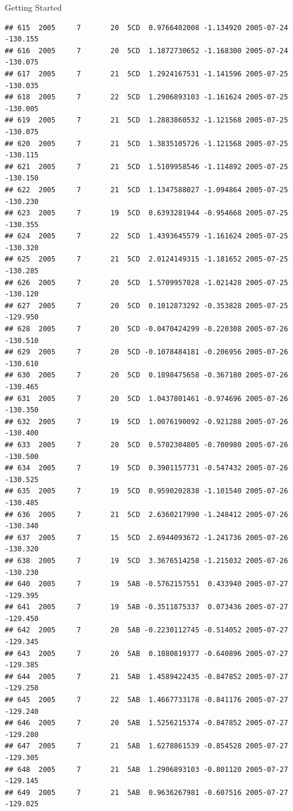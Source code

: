 \documentclass[
  ignorenonframetext,
]{beamer}
\begin{document}
\begin{frame}[fragile]{Getting Started}
\begin{verbatim}
## 615  2005     7       20  5CD  0.9766402008 -1.134920 2005-07-24 -130.155
## 616  2005     7       20  5CD  1.1872730652 -1.168300 2005-07-24 -130.075
## 617  2005     7       21  5CD  1.2924167531 -1.141596 2005-07-25 -130.035
## 618  2005     7       22  5CD  1.2906893103 -1.161624 2005-07-25 -130.005
## 619  2005     7       21  5CD  1.2883860532 -1.121568 2005-07-25 -130.075
## 620  2005     7       21  5CD  1.3835105726 -1.121568 2005-07-25 -130.115
## 621  2005     7       21  5CD  1.5109958546 -1.114892 2005-07-25 -130.150
## 622  2005     7       21  5CD  1.1347588027 -1.094864 2005-07-25 -130.230
## 623  2005     7       19  5CD  0.6393281944 -0.954668 2005-07-25 -130.355
## 624  2005     7       22  5CD  1.4393645579 -1.161624 2005-07-25 -130.320
## 625  2005     7       21  5CD  2.0124149315 -1.181652 2005-07-25 -130.285
## 626  2005     7       20  5CD  1.5709957028 -1.021428 2005-07-25 -130.120
## 627  2005     7       20  5CD  0.1012873292 -0.353828 2005-07-25 -129.950
## 628  2005     7       20  5CD -0.0470424299 -0.220308 2005-07-26 -130.510
## 629  2005     7       20  5CD -0.1078484181 -0.206956 2005-07-26 -130.610
## 630  2005     7       20  5CD  0.1898475658 -0.367180 2005-07-26 -130.465
## 631  2005     7       20  5CD  1.0437801461 -0.974696 2005-07-26 -130.350
## 632  2005     7       19  5CD  1.0076190092 -0.921288 2005-07-26 -130.400
## 633  2005     7       20  5CD  0.5702304805 -0.700980 2005-07-26 -130.500
## 634  2005     7       19  5CD  0.3901157731 -0.547432 2005-07-26 -130.525
## 635  2005     7       19  5CD  0.9590202838 -1.101540 2005-07-26 -130.485
## 636  2005     7       21  5CD  2.6360217990 -1.248412 2005-07-26 -130.340
## 637  2005     7       15  5CD  2.6944093672 -1.241736 2005-07-26 -130.320
## 638  2005     7       19  5CD  3.3676514258 -1.215032 2005-07-26 -130.230
## 640  2005     7       19  5AB -0.5762157551  0.433940 2005-07-27 -129.395
## 641  2005     7       19  5AB -0.3511875337  0.073436 2005-07-27 -129.450
## 642  2005     7       20  5AB -0.2230112745 -0.514052 2005-07-27 -129.345
## 643  2005     7       20  5AB  0.1080819377 -0.640896 2005-07-27 -129.385
## 644  2005     7       21  5AB  1.4589422435 -0.847852 2005-07-27 -129.250
## 645  2005     7       22  5AB  1.4667733178 -0.841176 2005-07-27 -129.240
## 646  2005     7       20  5AB  1.5256215374 -0.847852 2005-07-27 -129.280
## 647  2005     7       21  5AB  1.6278861539 -0.854528 2005-07-27 -129.305
## 648  2005     7       21  5AB  1.2906893103 -0.801120 2005-07-27 -129.145
## 649  2005     7       21  5AB  0.9636267981 -0.607516 2005-07-27 -129.025

\end{verbatim}
\end{frame}
\end{document}
